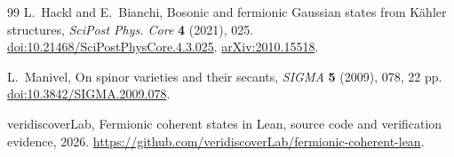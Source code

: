 \begin{thebibliography}{99}
L.~Hackl and E.~Bianchi,
Bosonic and fermionic Gaussian states from K\"ahler structures,
\emph{SciPost Phys. Core} \textbf{4} (2021), 025.
\href{https://doi.org/10.21468/SciPostPhysCore.4.3.025}{doi:10.21468/SciPostPhysCore.4.3.025}.
\href{https://arxiv.org/abs/2010.15518}{arXiv:2010.15518}.

L.~Manivel,
On spinor varieties and their secants,
\emph{SIGMA} \textbf{5} (2009), 078, 22 pp.
\href{https://doi.org/10.3842/SIGMA.2009.078}{doi:10.3842/SIGMA.2009.078}.

veridiscoverLab,
Fermionic coherent states in Lean,
source code and verification evidence, 2026.
\url{https://github.com/veridiscoverLab/fermionic-coherent-lean}.

\end{thebibliography}
\endgroup
